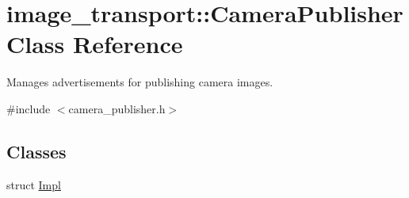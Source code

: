 \hypertarget{classimage__transport_1_1_camera_publisher}{\section{image\-\_\-transport\-:\-:Camera\-Publisher Class Reference}
\label{classimage__transport_1_1_camera_publisher}
}


Manages advertisements for publishing camera images.  




{\ttfamily \#include $<$camera\-\_\-publisher.\-h$>$}

\subsection*{Classes}
\begin{DoxyCompactItemize}
\item 
struct \hyperlink{structimage__transport_1_1_camera_publisher_1_1_impl}{Impl}
\end{DoxyCompactItemize}
